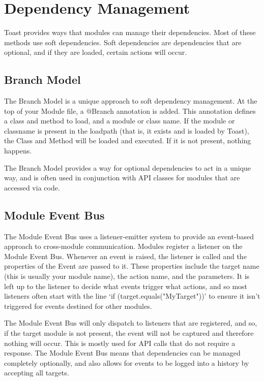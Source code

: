 \documentclass[a4paper,12pt]{article}
\begin{document}
\newpage

\section{Dependency Management}
Toast provides ways that modules can manage their dependencies. Most of these methods use soft dependencies. Soft dependencies are dependencies that are optional, and if they are loaded, certain actions will occur. 

\subsection{Branch Model}
The Branch Model is a unique approach to soft dependency management. At the top of your Module file, a @Branch annotation is added. This annotation defines a class and method to load, and a module or class name. If the module or classname is present in the loadpath (that is, it exists and is loaded by Toast), the Class and Method will be loaded and executed. If it is not present, nothing happens. 

The Branch Model provides a way for optional dependencies to act in a unique way, and is often used in conjunction with API classes for modules that are accessed via code.

\subsection{Module Event Bus}
The Module Event Bus uses a listener-emitter system to provide an event-based approach to cross-module communication. Modules register a listener on the Module Event Bus. Whenever an event is raised, the listener is called and the properties of the Event are passed to it. These properties include the target name (this is usually your module name), the action name, and the parameters. It is left up to the listener to decide what events trigger what actions, and so  most listeners often start with the line `if (target.equals("MyTarget"))' to ensure it isn't triggered for events destined for other modules.

The Module Event Bus will only dispatch to listeners that are registered, and so, if the target module is not present, the event will not be captured and therefore nothing will occur. This is mostly used for API calls that do not require a response. The Module Event Bus means that dependencies can be managed completely optionally, and also allows for events to be logged into a history by accepting all targets.
\end{document}
